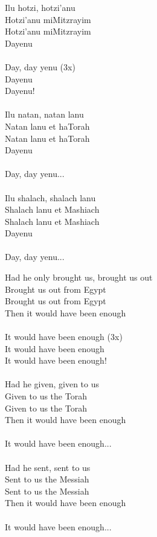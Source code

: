 \documentclass[10pt,oneside,footinclude=true,headinclude=true]{scrbook} %
\begin{document}
\footnotesize
{}
\begin{paracol}{2}
\begin{leftcolumn}
\noindent Ilu hotzi, hotzi'anu\\
Hotzi'anu miMitzrayim\\
Hotzi'anu miMitzrayim\\
Dayenu\\
\\
Day, day yenu (3x)\\
Dayenu\\
Dayenu!\\
\\
Ilu natan, natan lanu\\
Natan lanu et haTorah\\
Natan lanu et haTorah\\
Dayenu\\
\\
Day, day yenu...\\
\\
Ilu shalach, shalach lanu\\
Shalach lanu et Mashiach\\
Shalach lanu et Mashiach\\
Dayenu\\
\\
Day, day yenu...\\
\end{leftcolumn}
\begin{rightcolumn}
\noindent Had he only brought us, brought us out\\
Brought us out from Egypt\\
Brought us out from Egypt\\
Then it would have been enough\\
\\
It would have been enough (3x)\\
It would have been enough\\
It would have been enough!\\
\\
Had he given, given to us\\
Given to us the Torah\\
Given to us the Torah\\
Then it would have been enough\\
\\
It would have been enough...\\
\\
Had he sent, sent to us\\
Sent to us the Messiah\\
Sent to us the Messiah\\
Then it would have been enough\\
\\
It would have been enough...\\
\end{rightcolumn}
\end{paracol}
\end{document}
